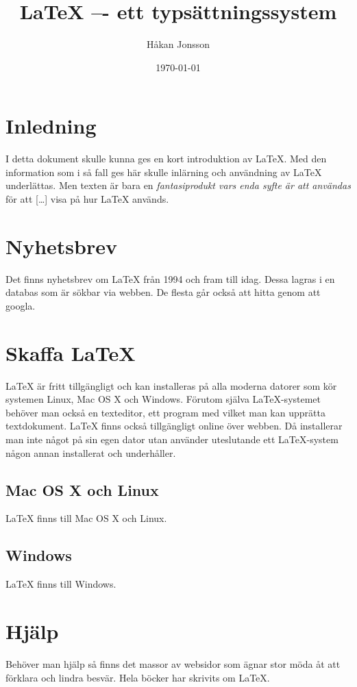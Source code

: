 \documentclass[12pt]{article}
\title{LaTeX –- ett typsättningssystem}
\author{Håkan Jonsson}
\date{\today}
\begin{document}
\maketitle

\section{Inledning}
I detta dokument skulle kunna ges en kort introduktion av LaTeX. Med den
information som i så fall ges här skulle inlärning och användning av
LaTeX underlättas. Men texten är bara en \emph{fantasiprodukt vars enda syfte
är att användas} för att [\dots] visa på hur LaTeX används.

\section{Nyhetsbrev}
Det finns nyhetsbrev om LaTeX från 1994 och fram till idag. Dessa
lagras i en databas som är sökbar via webben. De flesta går också att
hitta genom att googla. 

\section{Skaffa LaTeX}
LaTeX är fritt tillgängligt och kan installeras på alla moderna
datorer som kör systemen Linux, Mac OS X och Windows. Förutom själva
LaTeX-systemet behöver man också en texteditor, ett program med vilket
man kan upprätta textdokument. LaTeX finns också
tillgängligt online över webben. Då installerar man inte något på sin
egen dator utan använder uteslutande ett LaTeX-system någon annan
installerat och underhåller. 

\subsection{Mac OS X och Linux}
LaTeX finns till Mac OS X och Linux.

\subsection{Windows}
LaTeX finns till Windows.

\section{Hjälp}
Behöver man hjälp så finns det massor av websidor som ägnar stor möda
åt att förklara och lindra besvär. Hela böcker har skrivits om LaTeX.
\end{document}
